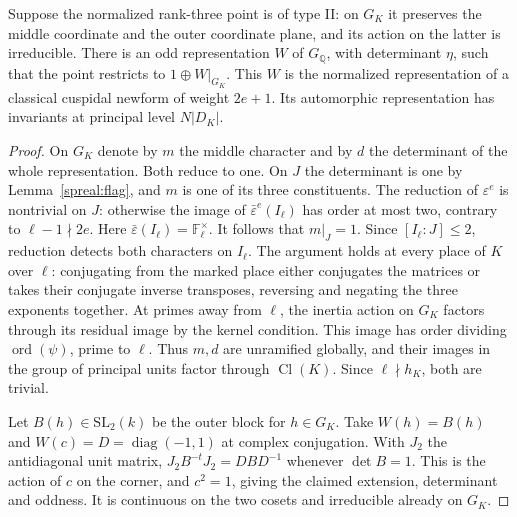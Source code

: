 \begin{proposition}\label{spreal:end}
Suppose the normalized rank-three point is of type II: on \(G_K\) it
preserves the middle coordinate and the outer coordinate plane,
and its action on the latter is irreducible. There is an odd
representation \(W\) of \(G_{\mathbb Q}\), with determinant \(\eta\),
such that the point restricts to \(1\oplus W|_{G_K}\). This \(W\)
is the normalized representation of a classical cuspidal newform
of weight \(2e+1\). Its automorphic representation has invariants
at principal level \(N|D_K|\).
\end{proposition}
\begin{proof}
On \(G_K\) denote by \(m\) the middle character and by \(d\) the
determinant of the whole representation. Both reduce to one. On \(J\)
the determinant is one by Lemma~\ref{spreal:flag}, and \(m\) is one
of its three constituents. The reduction of \(\varepsilon^e\) is
nontrivial on \(J\): otherwise the image of
\(\bar\varepsilon^e(I_\ell)\) has order at most two, contrary to
\(\ell-1\nmid2e\). Here \(\bar\varepsilon(I_\ell)=\mathbb F_\ell^\times\).
It follows that \(m|_J=1\). Since \([I_\ell:J]\le2\), reduction
detects both characters on \(I_\ell\). The argument holds at every
place of \(K\) over \(\ell\): conjugating from the marked place
either conjugates the matrices or takes their conjugate inverse
transposes, reversing and negating the three exponents together.
At primes away from \(\ell\), the inertia action on \(G_K\) factors
through its residual image by the kernel condition. This image has
order dividing \(\operatorname{ord}(\psi)\), prime to \(\ell\).
Thus \(m,d\) are unramified globally, and their images in the group
of principal units factor through \(\operatorname{Cl}(K)\). Since
\(\ell\nmid h_K\), both are trivial.

Let \(B(h)\in\mathrm{SL}_2(k)\) be the outer block for \(h\in G_K\).
Take \(W(h)=B(h)\) and \(W(c)=D=\operatorname{diag}(-1,1)\) at
complex conjugation. With \(J_2\) the antidiagonal unit matrix,
\(J_2B^{-t}J_2=DBD^{-1}\) whenever \(\det B=1\).
This is the action of \(c\) on the corner, and \(c^2=1\), giving the
claimed extension, determinant and oddness. It is continuous on the
two cosets and irreducible already on \(G_K\).


\end{proof}
